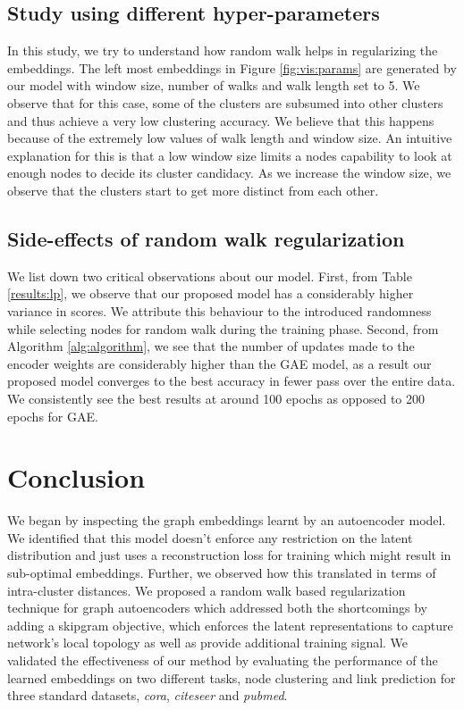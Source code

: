 \documentclass{article}
\begin{document}
\subsection{Study using different hyper-parameters}
In this study, we try to understand how random walk helps in regularizing the embeddings. The left most embeddings in Figure \ref{fig:vis:params} are generated by our model with window size, number of walks and walk length set to 5. We observe that for this case, some of the clusters are subsumed into other clusters and thus achieve a very low clustering accuracy. We believe that this happens because of the extremely low values of walk length and window size. An intuitive explanation for this is that a low window size limits a nodes capability to look at enough nodes to decide its cluster candidacy. As we increase the window size, we observe that the clusters start to get more distinct from each other.

\subsection{Side-effects of random walk regularization}
We list down two critical observations about our model. First, from Table \ref{results:lp}, we observe that our proposed model has a considerably higher variance in scores. We attribute this behaviour to the introduced randomness while selecting nodes for random walk during the training phase. Second, from Algorithm \ref{alg:algorithm}, we see that the number of updates made to the encoder weights are considerably higher than the GAE model, as a result our proposed model converges to the best accuracy in fewer pass over the entire data. We consistently see the best results at around 100 epochs as opposed to 200 epochs for GAE.

\section{Conclusion}
We began by inspecting the graph embeddings learnt by an autoencoder model. 
We identified that this model doesn't enforce any restriction on the latent distribution and just uses a reconstruction loss for training which might result in sub-optimal embeddings. Further, we observed how this translated in terms of intra-cluster distances. We proposed a random walk based regularization technique for graph autoencoders which addressed both the shortcomings by adding a skipgram objective, which enforces the latent representations to capture network's local topology as well as provide additional training signal. We validated the effectiveness of our method by evaluating the performance of the learned embeddings on two different tasks, node clustering and link prediction for three standard datasets, \textit{cora}, \textit{citeseer} and \textit{pubmed}.







\end{document}
